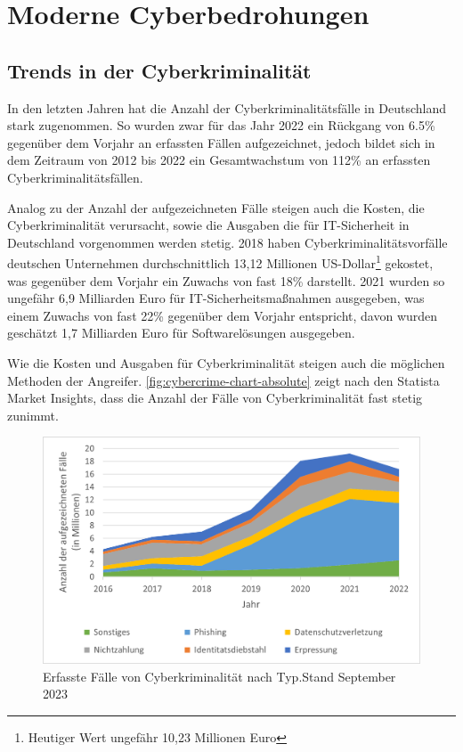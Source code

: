 \newpage


\section{Moderne Cyberbedrohungen}\label{sec:moderne-cyberbedrohungen}

\subsection{Trends in der Cyberkriminalität}\label{subsec:trends-und-entwicklungen-in-der-cyberkriminalitat}
In den letzten Jahren hat die Anzahl der Cyberkriminalitätsfälle in Deutschland stark zugenommen.
So wurden zwar für das Jahr 2022 ein Rückgang von 6.5\% gegenüber dem Vorjahr an erfassten Fällen aufgezeichnet, jedoch bildet sich in dem Zeitraum von 2012 bis 2022 ein Gesamtwachstum von 112\% an erfassten Cyberkriminalitätsfällen\autocite[\vglf][]{bka-cyberkriminalitaet}.

Analog zu der Anzahl der aufgezeichneten Fälle steigen auch die Kosten, die Cyberkriminalität verursacht, sowie die Ausgaben die für IT-Sicherheit in Deutschland vorgenommen werden stetig.
2018 haben Cyberkriminalitätsvorfälle deutschen Unternehmen durchschnittlich 13,12 Millionen US-Dollar\footnote{Heutiger Wert ungefähr 10,23 Millionen Euro} gekostet, was gegenüber dem Vorjahr ein Zuwachs von fast 18\% darstellt\autocite[\vglf][]{accenture-cyberkrime-kosten}.
2021 wurden so ungefähr 6,9 Milliarden Euro für IT-Sicherheitsmaßnahmen ausgegeben, was einem Zuwachs von fast 22\% gegenüber dem Vorjahr entspricht\autocite[\vglf][]{bitkom-itsicherheit}, davon wurden geschätzt 1,7 Milliarden Euro für Softwarelösungen ausgegeben\autocite[\vglf][]{bitkom-itsicherheit-segment}.

Wie die Kosten und Ausgaben für Cyberkriminalität steigen auch die möglichen Methoden der Angreifer.
\autoref{fig:cybercrime-chart-absolute} zeigt nach den Statista Market Insights\autocite[\vglf][]{statista-cybersecurity-cybercrime}, dass die Anzahl der Fälle von Cyberkriminalität fast stetig zunimmt.

\begin{figure}[htpb]
    \centering
    \includegraphics[width = 0.75\linewidth, trim = {0.55cm 0.3cm 0.4cm 0.25cm}, clip]{src/abbildungen/Aufgezeichnete_Cyberkriminalitaet}
    \captionsetup{width=\linewidth, format=hang}
    \caption[Erfasste Fälle von Cyberkriminalität nach Typ]{Erfasste Fälle von Cyberkriminalität nach Typ.\newline Stand September 2023}
    \label{fig:cybercrime-chart-absolute}
\end{figure}

